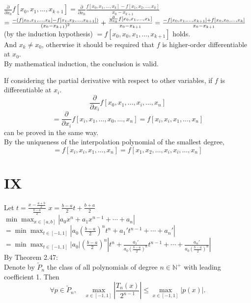 \documentclass[a4paper]{article}
\begin{document}
\(\frac{\partial}{\partial x_0} f[x_0, x_1, \ldots, x_{k+1}] = \frac{\partial}{\partial x_0} \frac{f[x_0, x_1, \ldots, x_k] - f[x_1, x_2, \ldots, x_k]}{x_0 - x_{k+1}}\)
\(= \frac{-(f[x_0, x_1, \ldots, x_k] - f[x_1, x_2, \ldots, x_{k+1}])}{(x_0 - x_{k+1})^2} + \frac{\frac{\partial}{\partial x_0} f[x_0, x_1, \ldots, x_k]}{x_0 - x_{k+1}} = \\
\frac{-f[x_0, x_1, \ldots, x_{k+1}] + f[x_0, x_0, \ldots, x_k]}{x_0 - x_{k+1}} \) (by the induction hypothesis) \( = f[x_0, x_0, x_1, \ldots, x_{k+1}] \) holds.\\
And \( x_k \neq x_0 \), otherwise it should be required that \( f \) is higher-order differentiable at \( x_0 \).\\
By mathematical induction, the conclusion is valid.

If considering the partial derivative with respect to other variables, if \( f \) is differentiable at \( x_i \).\\
\[
\frac{\partial}{\partial x_i} f[x_0, x_1, \ldots, x_i, \ldots, x_n]
\]
\[
= \frac{\partial}{\partial x_i} f[x_i, x_1, \ldots, x_0, \ldots, x_n]=f[x_i, x_i, x_1, \ldots, x_n]
\]
can be proved in the same way.\\
By the uniqueness of the interpolation polynomial of the smallest degree,\\
\[
= f[x_i, x_i, x_1, \ldots, x_n] = f[x_1, x_2, \ldots, x_i, x_i, \ldots, x_n]
\]


\section*{IX}
Let \( t = \frac{x - \frac{a+b}{2}}{\frac{b-a}{2}} \)
\( x = \frac{b-a}{2}t + \frac{b+a}{2} \)\\
\( \min \max_{x \in [a, b]} \left| a_0 x^n + a_1 x^{n-1} + \cdots + a_n \right| \)\\
\( = \min \max_{t \in [-1, 1]} \left| a_0 \left(\frac{b-a}{2}\right)^n t^n + a_1' t^{n-1} + \cdots + a_n' \right| \)\\
\( = \min \max_{t \in [-1, 1]} \left| a_0 \right| \left(\frac{b-a}{2}\right)^n \left| t^n + \frac{a_1'}{a_0 \left(\frac{b-a}{2}\right)^n} t^{n-1} + \cdots + \frac{a_n'}{a_0 \left(\frac{b-a}{2}\right)^n} \right| \)\\
By Theorem 2.47:\\
Denote by \( \tilde{P}_{n} \) the class of all polynomials of degree \( n \in \mathbb{N}^{+} \) with leading coefficient 1. Then\\
\[
\forall p \in \tilde{P}_{n}, \quad \max_{x \in [-1,1]} \left| \frac{T_{n}(x)}{2^{n-1}} \right| \leq \max_{x \in [-1,1]} \left| p(x) \right|.
\]
\end{document}
